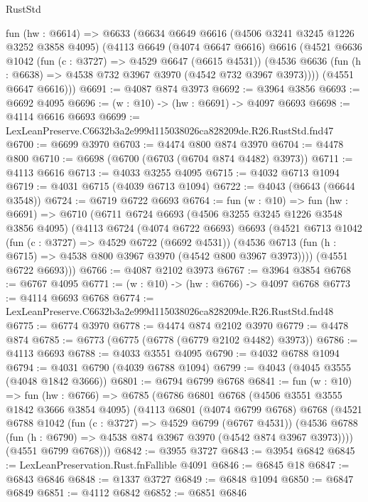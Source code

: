 \begin{lexlean}{RustStd}
\begin{coremodule}
  fun (hw : @6614) =>
  @6633
    (@6634
      @6649
      @6616
      (@4506 @3241 @3245 @1226 @3252 @3858 @4095)
      (@4113
        @6649
        (@4074 @6647 @6616)
        @6616
        (@4521
          @6636
          @1042
          (fun (c : @3727) => @4529 @6647 (@6615 @4531))
          (@4536 @6636 (fun (h : @6638) => @4538 @732 @3967 @3970 (@4542 @732 @3967 @3973))))
        (@4551 @6647 @6616)))
@6691 := @4087 @874 @3973
@6692 := @3964 @3856
@6693 := @6692 @4095
@6696 := (w : @10) -> (hw : @6691) -> @4097 @6693
@6698 := @4114 @6616 @6693
@6699 := LexLeanPreserve.C6632b3a2e999d115038026ca828209de.R26.RustStd.fnd47
@6700 := @6699 @3970
@6703 := @4474 @800 @874 @3970
@6704 := @4478 @800
@6710 := @6698 (@6700 (@6703 (@6704 @874 @4482) @3973))
@6711 := @4113 @6616
@6713 := @4033 @3255 @4095
@6715 := @4032 @6713 @1094
@6719 := @4031 @6715 (@4039 @6713 @1094)
@6722 := @4043 (@6643 (@6644 @3548))
@6724 := @6719 @6722 @6693
@6764 := fun (w : @10) =>
  fun (hw : @6691) =>
  @6710
    (@6711
      @6724
      @6693
      (@4506 @3255 @3245 @1226 @3548 @3856 @4095)
      (@4113
        @6724
        (@4074 @6722 @6693)
        @6693
        (@4521
          @6713
          @1042
          (fun (c : @3727) => @4529 @6722 (@6692 @4531))
          (@4536 @6713 (fun (h : @6715) => @4538 @800 @3967 @3970 (@4542 @800 @3967 @3973))))
        (@4551 @6722 @6693)))
@6766 := @4087 @2102 @3973
@6767 := @3964 @3854
@6768 := @6767 @4095
@6771 := (w : @10) -> (hw : @6766) -> @4097 @6768
@6773 := @4114 @6693 @6768
@6774 := LexLeanPreserve.C6632b3a2e999d115038026ca828209de.R26.RustStd.fnd48
@6775 := @6774 @3970
@6778 := @4474 @874 @2102 @3970
@6779 := @4478 @874
@6785 := @6773 (@6775 (@6778 (@6779 @2102 @4482) @3973))
@6786 := @4113 @6693
@6788 := @4033 @3551 @4095
@6790 := @4032 @6788 @1094
@6794 := @4031 @6790 (@4039 @6788 @1094)
@6799 := @4043 (@4045 @3555 (@4048 @1842 @3666))
@6801 := @6794 @6799 @6768
@6841 := fun (w : @10) =>
  fun (hw : @6766) =>
  @6785
    (@6786
      @6801
      @6768
      (@4506 @3551 @3555 @1842 @3666 @3854 @4095)
      (@4113
        @6801
        (@4074 @6799 @6768)
        @6768
        (@4521
          @6788
          @1042
          (fun (c : @3727) => @4529 @6799 (@6767 @4531))
          (@4536 @6788 (fun (h : @6790) => @4538 @874 @3967 @3970 (@4542 @874 @3967 @3973))))
        (@4551 @6799 @6768)))
@6842 := @3955 @3727
@6843 := @3954 @6842
@6845 := LexLeanPreservation.Rust.fnFallible @4091
@6846 := @6845 @18
@6847 := @6843 @6846
@6848 := @1337 @3727
@6849 := @6848 @1094
@6850 := @6847 @6849
@6851 := @4112 @6842
@6852 := @6851 @6846

\end{coremodule}
\end{lexlean}
